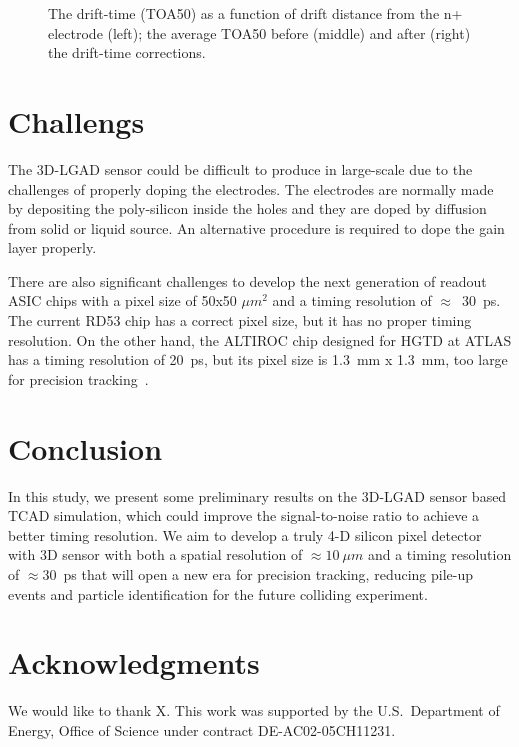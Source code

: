\documentclass[aps,pt14,superscriptaddress,showpacs,floatfix,nofootinbib]{revtex4}
\begin{document}
\begin{figure}[hbtp]
\begin{center}
\caption{The drift-time (TOA50) as a function of drift distance from the n+ electrode (left); the average TOA50 before (middle) and 
after (right) the drift-time corrections.~\label{fig:kdettoa}}
\end{center}
\end{figure}

\section{Challengs} 

The 3D-LGAD sensor could be difficult to
produce in large-scale due to the challenges of properly doping the electrodes.
The electrodes are normally made by depositing the poly-silicon inside the holes and
they are doped by diffusion from solid or liquid source.
An alternative procedure is required to dope the gain layer properly. 

There are also significant challenges to develop the next generation of readout ASIC chips with
a pixel size of 50x50 $\mu m^2$ and a timing resolution of $\approx$~30~ps.
The current RD53 chip has a correct pixel size, but it has no proper
timing resolution. On the other hand, the ALTIROC chip designed for HGTD at ATLAS has
a timing resolution of 20~ps, but its pixel size is 1.3~mm x 1.3~mm,
too large for precision tracking~\cite{delaTaille:2018qap}.

\section{Conclusion}

In this study, we present some preliminary results on the 3D-LGAD sensor based TCAD simulation, which
could improve the signal-to-noise ratio to achieve a better timing resolution.
We aim to develop a truly 4-D silicon pixel detector with 3D sensor with both a spatial
resolution of $\approx 10~\mu m$ and a timing resolution of $\approx$30~ps
that  will open a new era for precision tracking, reducing pile-up
events and particle identification for the future colliding experiment.

\section*{Acknowledgments}

We would like to thank X.  This work was supported by the U.S.~Department of Energy, Office of Science under contract DE-AC02-05CH11231. 


\def\bibname{\Large\bf References}
\def\refname{\Large\bf References}
\pagestyle{plain}

\end{document}
